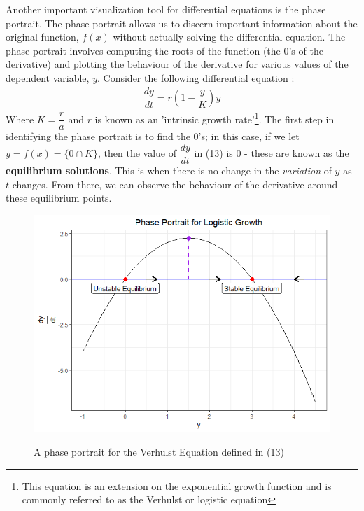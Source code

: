 \documentclass{article}
\begin{document}
\noindent Another important visualization tool for differential equations is the phase portrait. The phase portrait allows us to discern important information about the original function, $f(x)$ without actually solving the differential equation. The phase portrait involves computing the roots of the function (the 0's of the derivative) and plotting the behaviour of the derivative for various values of the dependent variable, $y$. Consider the following differential equation \cite{de}:
\begin{align}
    \dfrac{dy}{dt} = r(1 - \dfrac{y}{K})y
\end{align}
\noindent Where $K = \dfrac{r}{a}$ and $r$ is known as an 'intrinsic growth rate'\footnote{This equation is an extension on the exponential growth function and is commonly referred to as the Verhulst or logistic equation}. The first step in identifying the phase portrait is to find the 0's; in this case, if we let $y = f(x) = \{0\cap K\}$, then the value of $\dfrac{dy}{dt}$ in (13) is 0 - these are known as the \textbf{equilibrium solutions}. This is when there is no change in the \textit{variation} of $y$ as $t$ changes. From there, we can observe the behaviour of the derivative around these equilibrium points. 

\begin{figure}[h!]
  \centering
  \includegraphics[scale = 0.6]{phasePortrait.png}
  \label{fig:phasePortrait}
  \caption{A phase portrait for the Verhulst Equation defined in (13)}
\end{figure}
\end{document}
